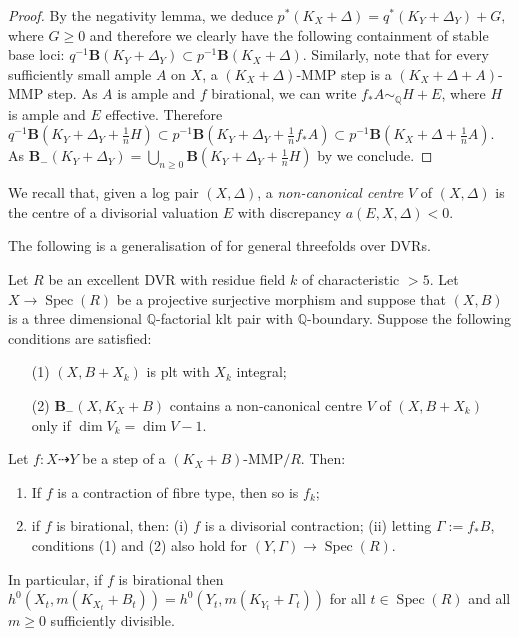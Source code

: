 \documentclass[a4paper,12pt]{book}
\DeclareMathOperator{\Spec}{Spec}
\newcommand{\bQ}{\mathbb{Q}}
\begin{document}
	\begin{proof}
		By the negativity lemma, we deduce $p^*(K_X+\Delta)=q^*(K_Y+\Delta_Y)+G,$ where $G \geq 0$ and therefore we clearly have the following containment of stable base loci: $q^{-1}\mathbf{B}(K_Y+\Delta_Y) \subset p^{-1}\mathbf{B}(K_X+\Delta).$
		Similarly, note that for every sufficiently small ample $A$ on $X$,
		a $(K_X+\Delta)$-MMP step is a $(K_X+\Delta+A)$-MMP step. As $A$ is ample and $f$ birational, we can write $f_*A \sim_{\mathbb{Q}} H+E$, where $H$ is ample and $E$ effective. 
		Therefore  $q^{-1}\mathbf{B}(K_Y+\Delta_Y+\frac{1}{n}H) \subset p^{-1}\mathbf{B}(K_Y+\Delta_Y+ \frac{1}{n}f_*A)\subset  p^{-1}\mathbf{B}(K_X+\Delta+ \frac{1}{n}A) $.
		As $\mathbf{B}_{-}(K_Y+\Delta_Y)=\bigcup_{n \geq 0} \mathbf{B}(K_Y+\Delta_Y+\frac{1}{n}H)$ by \cite[Proposition 1.19]{asympt-baseloci} we conclude.
	\end{proof}

	We recall that, given a log pair $(X,\Delta)$, a \emph{non-canonical centre} $V$ of $(X,\Delta)$ is the centre of a divisorial valuation $E$ with discrepancy $a(E, X, \Delta)<0$.  

The following is a generalisation of \cite[Lemma 3.1]{HMX18} for general threefolds over DVRs. 
	
	\begin{proposition}\label{lemma:MMP_in_fam2}
		Let $R$ be an excellent DVR with residue field $k$ of characteristic $>5$. Let $X \to \Spec(R)$ be a projective surjective morphism and suppose that $(X,B)$ is a three dimensional $\bQ$-factorial klt pair with $\mathbb{Q}$-boundary.
		Suppose the following conditions are satisfied:
		\begin{itemize}
		\item[(1)] $(X,B+X_k)$ is plt with $X_k$ integral;
		\item[(2)] ${\mathbf{B}_{-}(X, K_{X}+B)}$ contains a non-canonical centre $V$ of $(X,B+X_{k})$ only if $\dim V_{k}=\dim V -1$.
		\end{itemize}
		Let $f \colon X\dashrightarrow Y$ be a step of a $(K_X+B)$-MMP$/R$. Then:
		\begin{enumerate}
			\item  If $f$ is a contraction of fibre type, then so is $f_k$;
			\item if $f$ is birational, then:
			\subitem(i) $f$ is a divisorial contraction;
			\subitem(ii) letting $\Gamma:=f_\ast B$, conditions (1) and (2) also hold for $(Y,\Gamma)\to\Spec (R)$.
		\end{enumerate} 
		In particular, if $f$ is birational then $h^0(X_t,m(K_{X_t}+B_t))=h^0(Y_t,m(K_{Y_t}+\Gamma_t))$ for all $t\in\Spec (R)$ and all $m\geq 0$ sufficiently divisible.
	\end{proposition}
	
\end{document}
